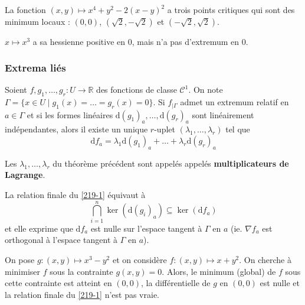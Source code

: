   \begin{example}
    La fonction $(x,y) \mapsto x^4 + y^2 - 2(x-y)^2$ a trois points critiques qui sont des minimum locaux : $(0,0)$, $(\sqrt{2},-\sqrt{2})$ et $(-\sqrt{2},\sqrt{2})$.
  \end{example}

  \begin{cexample}
    $x \mapsto x^3$ a sa hessienne positive en $0$, mais n'a pas d'extremum en $0$.
  \end{cexample}

  \subsubsection{Extrema liés}


  \begin{theorem}
    \label{219-1}
    Soient $f, g_1, \dots, g_r : U \rightarrow \mathbb{R}$ des fonctions de classe $\mathcal{C}^1$. On note $\Gamma = \{ x \in U \mid g_1(x) = \dots = g_r(x) = 0 \}$. Si $f_{|\Gamma}$ admet un extremum relatif en $a \in \Gamma$ et si les formes linéaires $\mathrm{d}(g_1)_a, \dots, \mathrm{d}(g_r)_a$ sont linéairement indépendantes, alors il existe un unique $r$-uplet $(\lambda_1, \dots, \lambda_r)$ tel que
    \[ \mathrm{d}f_a = \lambda_1 \mathrm{d}(g_1)_a + \dots + \lambda_r \mathrm{d}(g_r)_a \]
  \end{theorem}

  \begin{definition}
    Les $\lambda_1, \dots, \lambda_r$ du théorème précédent sont appelés appelés \textbf{multiplicateurs de Lagrange}.
  \end{definition}


  \begin{remark}
    La relation finale du \cref{219-1} équivaut à
    \[ \bigcap_{i=1}^n \ker(\mathrm{d}(g_i)_a) \subseteq \ker(\mathrm{d}f_a) \]
    et elle exprime que $\mathrm{d}f_a$ est nulle sur l'espace tangent à $\Gamma$ en $a$ (ie. $\nabla f_a$ est orthogonal à l'espace tangent à $\Gamma$ en $a$).
  \end{remark}

  \begin{cexample}
    On pose $g : (x,y) \mapsto x^3-y^2$ et on considère $f : (x, y) \mapsto x+y^2$. On cherche à minimiser $f$ sous la contrainte $g(x,y) = 0$.
    \newpar
    Alors, le minimum (global) de $f$ sous cette contrainte est atteint en $(0,0)$, la différentielle de $g$ en $(0,0)$ est nulle et la relation finale du \cref{219-1} n'est pas vraie.
  \end{cexample}

